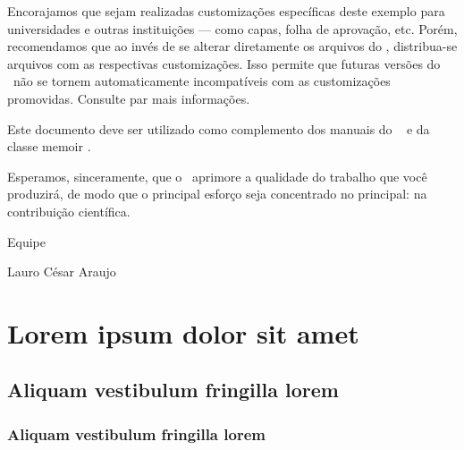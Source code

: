 \documentclass[
	12pt,				%
	openright,			%
	twoside,			%
	a4paper,			%
	tcc,			%
]{cct-uenp}
\begin{document}
Encorajamos que sejam realizadas customizações específicas deste exemplo para
universidades e outras instituições --- como capas, folha de aprovação, etc.
Porém, recomendamos que ao invés de se alterar diretamente os arquivos do
\abnTeX, distribua-se arquivos com as respectivas customizações.
Isso permite que futuras versões do \abnTeX~não se tornem automaticamente
incompatíveis com as customizações promovidas. Consulte
 par mais informações.

Este documento deve ser utilizado como complemento dos manuais do \abnTeX\ 
\cite{abntex2classe,abntex2cite,abntex2cite-alf} e da classe \textsf{memoir}
\cite{memoir}. 

Esperamos, sinceramente, que o \abnTeX\ aprimore a qualidade do trabalho que
você produzirá, de modo que o principal esforço seja concentrado no principal:
na contribuição científica.

Equipe \abnTeX 

Lauro César Araujo







\chapter{Lorem ipsum dolor sit amet}

\section{Aliquam vestibulum fringilla lorem}


\subsection{Aliquam vestibulum fringilla lorem}
\end{document}

